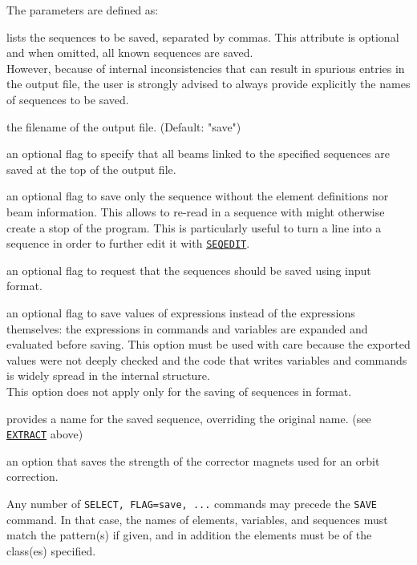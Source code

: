 The parameters are defined as:
\begin{madlist}
         lists the sequences to be saved, separated by commas.
        This attribute is optional and when omitted, all known
        sequences are saved. \\
        However, because of internal inconsistencies that can result in spurious
        entries in the output file, the user is strongly advised to always provide
        explicitly the names of sequences to be saved.

         the filename of the output file. (Default: "save")

         an optional flag to specify that all beams linked to the
        specified sequences are saved at the top of the output file.

         an optional flag to save only the sequence without the
        element definitions nor beam information. This allows to re-read in a
        sequence with might otherwise create a stop of the program. This is
        particularly useful to turn a line into a sequence in order to further edit
        it with \hyperref[sec:seqedit]{\texttt{SEQEDIT}}.

         an optional flag to request that the sequences should be
        saved using \madeight input format.

         an optional flag to save values of expressions
        instead of the expressions themselves: the expressions in commands
        and variables are expanded and evaluated before saving.
        This option must be used with care because the exported values were not deeply
        checked and the code that writes variables and commands is widely spread
        in the internal structure. \\
        This option does not apply only for the saving of sequences in \madeight format.

         provides a name for the saved sequence, overriding the
        original name. (see \hyperref[sec:extract]{\texttt{EXTRACT}} above)

   an option that saves the strength of the corrector magnets used
  for an orbit correction.
\end{madlist}

Any number of \texttt{SELECT, FLAG=save, ...} commands may precede
the \texttt{SAVE} command. In that case, the names of elements, variables, and
sequences must match the pattern(s) if given, and in addition the
elements must be of the class(es) specified.

